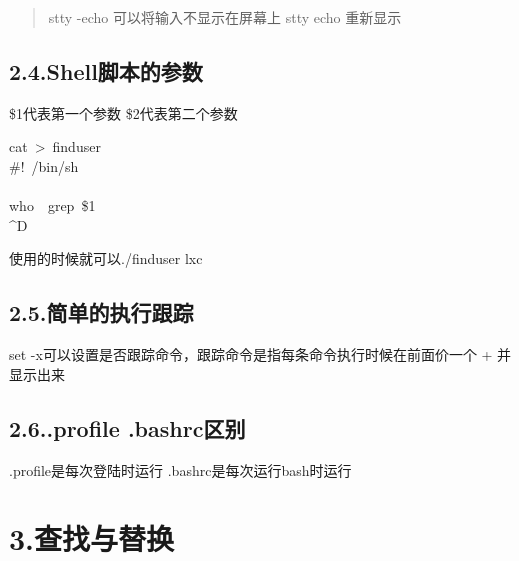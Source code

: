 \documentclass{article}
\begin{document}
\begin{quote}%

\noindent{}stty -echo\mdbr
{}可以将输入不显示在屏幕上\mdbr
{}stty echo\mdbr
{}重新显示 %
\end{quote}%

\subsection{2.4.\hspace*{0.5em}Shell脚本的参数}\label{sec-shell}%

\noindent{}\$1代表第一个参数
\$2代表第二个参数%
\begin{mdpre}%
\noindent{}cat~\textgreater{}~finduser\\
\#!~/bin/sh\\
\\
who~\textbar{}~grep~\$1\\
\textasciicircum{}D%
\end{mdpre}\noindent{}使用的时候就可以./finduser lxc

\subsection{2.5.\hspace*{0.5em}简单的执行跟踪}\label{section}%

\noindent{}set -x可以设置是否跟踪命令，跟踪命令是指每条命令执行时候在前面价一个 + 并显示出来%

\subsection{2.6.\hspace*{0.5em}.profile .bashrc区别}\label{sec-profile-bashrc}%

\noindent{}.profile是每次登陆时运行\mdbr
{}.bashrc是每次运行bash时运行%

\section{3.\hspace*{0.5em}查找与替换}\label{section}%
\end{document}
